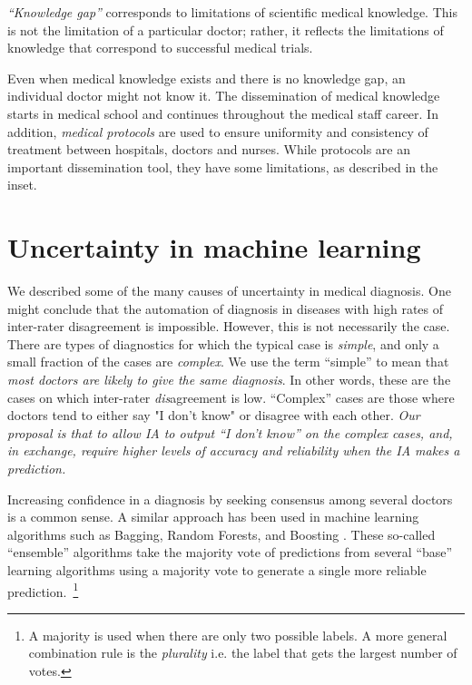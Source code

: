 \documentclass[11pt]{pnas-new}
\begin{document}
{\em ``Knowledge gap''} corresponds to limitations of scientific medical
knowledge. This is not the limitation of a particular doctor; rather,
it reflects the limitations of knowledge that correspond to successful
medical trials.


Even when medical knowledge exists {\color{red}and there is no knowledge gap}, an individual doctor might {\color{red}not}
know it. The dissemination of medical knowledge starts in medical
school and continues throughout the medical staff career. In addition,
{\em medical protocols} are used to ensure uniformity and
consistency of treatment between hospitals, doctors and nurses. While
protocols are an important dissemination tool, they have some limitations, 
as described in the inset.
~\\

\section{Uncertainty in machine learning}

We described some of the many causes of uncertainty in medical
diagnosis. One might conclude that the automation of diagnosis in
diseases with high rates of inter-rater disagreement is
impossible. However, this is not necessarily the case. There are types
of diagnostics for which the typical case is {\em simple}, and only a
small fraction of the cases are {\em complex}.  We use the term
``simple'' to mean that {\em most doctors are likely to give the same
  diagnosis}.  In other words, these are the cases on which
inter-rater {\em dis}agreement is low. ``Complex'' cases are those where
doctors tend to either say "I don't know" or disagree with each other.
{\em Our proposal is that to allow IA to output ``I don't know'' on
  the complex cases, and, in exchange, require higher levels of
  accuracy and reliability when the IA makes a prediction.}

Increasing confidence in a diagnosis by seeking consensus among
several doctors is a common sense. A similar approach has been
used in machine learning algorithms such as Bagging, Random Forests, and
Boosting \cite{}. These so-called ``ensemble'' algorithms take the
majority vote of predictions from several ``base'' learning algorithms using a majority
vote to generate a single more reliable prediction.~\footnote{A majority is
  used when there are only two possible labels. A more general
  combination rule is the {\em plurality} i.e. the label that gets the
  largest number of votes.}
\end{document}

